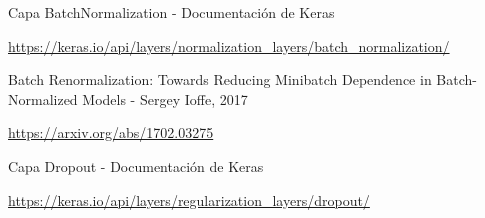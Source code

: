 \documentclass[12pt, spanish]{article}
\begin{document}
\begin{thebibliography}{9}

	Capa BatchNormalization - Documentación de Keras

	\url{https://keras.io/api/layers/normalization_layers/batch_normalization/}



	Batch Renormalization: Towards Reducing Minibatch Dependence in Batch-Normalized Models - Sergey Ioffe, 2017

	\url{https://arxiv.org/abs/1702.03275}



	Capa Dropout - Documentación de Keras

	\url{https://keras.io/api/layers/regularization_layers/dropout/}



\end{thebibliography}
\end{document}
